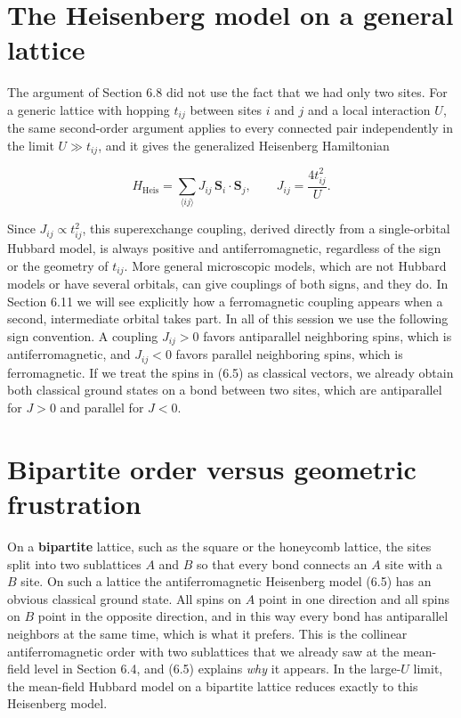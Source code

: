 \section{The Heisenberg model on a general lattice}

The argument of Section 6.8 did not use the fact that we had only two sites. For a generic lattice
with hopping $t_{ij}$ between sites $i$ and $j$ and a local interaction $U$, the same second-order
argument applies to every connected pair independently in the limit $U\gg t_{ij}$, and it gives the
generalized Heisenberg Hamiltonian

\begin{equation}
H_\text{Heis} = \sum_{\langle ij\rangle} J_{ij}\, \mathbf S_i\cdot\mathbf S_j, \qquad J_{ij} = \frac{4t_{ij}^2}{U}.
\end{equation}

Since $J_{ij}\propto t_{ij}^2$, this superexchange coupling, derived directly from a single-orbital
Hubbard model, is always positive and antiferromagnetic, regardless of the sign or the geometry of
$t_{ij}$. More general microscopic models, which are not Hubbard models or have several orbitals, can
give couplings of both signs, and they do. In Section 6.11 we will see explicitly how a ferromagnetic
coupling appears when a second, intermediate orbital takes part. In all of this session we use the
following sign convention. A coupling $J_{ij}>0$ favors antiparallel neighboring spins, which is
antiferromagnetic, and $J_{ij}<0$ favors parallel neighboring spins, which is ferromagnetic. If we
treat the spins in (6.5) as classical vectors, we already obtain both classical ground states on a
bond between two sites, which are antiparallel for $J>0$ and parallel for $J<0$.

\section{Bipartite order versus geometric frustration}

On a \textbf{bipartite} lattice, such as the square or the honeycomb lattice, the sites split into two
sublattices $A$ and $B$ so that every bond connects an $A$ site with a $B$ site. On such a lattice the
antiferromagnetic Heisenberg model (6.5) has an obvious classical ground state. All spins on $A$ point
in one direction and all spins on $B$ point in the opposite direction, and in this way every bond has
antiparallel neighbors at the same time, which is what it prefers. This is the collinear
antiferromagnetic order with two sublattices that we already saw at the mean-field level in Section
6.4, and (6.5) explains \emph{why} it appears. In the large-$U$ limit, the mean-field Hubbard model on
a bipartite lattice reduces exactly to this Heisenberg model.

